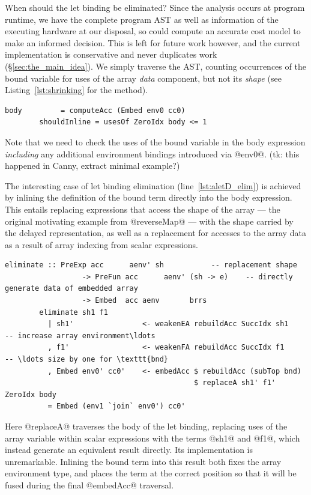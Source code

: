 When should the let binding be eliminated? Since the analysis occurs at program
runtime, we have the complete program AST as well as
information of the executing hardware at our disposal, so could compute an
accurate cost model to make an informed decision. This is left for future work
however, and the current implementation is conservative and never duplicates
work (\S\ref{sec:the_main_idea}). We simply traverse the AST, counting
occurrences of the bound variable for uses of the array \emph{data} component,
but not its \emph{shape} (see Listing~\ref{lst:shrinking} for the method).
%
\begin{lstlisting}[style=haskell,name=aletD]
        body         = computeAcc (Embed env0 cc0)
        shouldInline = usesOf ZeroIdx body <= 1
\end{lstlisting}
%
Note that we need to check the uses of the bound variable in the body expression
\emph{including} any additional environment bindings introduced via @env0@.
(tk: this happened in Canny, extract minimal example?)

The interesting case of let binding elimination (line~\ref{lst:aletD_elim}) is
achieved by inlining the definition of the bound term directly into the body
expression. This entails replacing expressions that access the shape of the
array --- the original motivating example from @reverseMap@ --- with the
shape carried by the delayed representation, as well as a replacement for
accesses to the array data as a result of array indexing from scalar
expressions.
%
\begin{lstlisting}[style=haskell,name=aletD]
        eliminate :: PreExp acc      aenv' sh           -- replacement shape
                  -> PreFun acc      aenv' (sh -> e)    -- directly generate data of embedded array
                  -> Embed  acc aenv       brrs
        eliminate sh1 f1
          | sh1'                <- weakenEA rebuildAcc SuccIdx sh1      -- increase array environment\ldots
          , f1'                 <- weakenFA rebuildAcc SuccIdx f1       -- \ldots size by one for \texttt{bnd}
          , Embed env0' cc0'    <- embedAcc $ rebuildAcc (subTop bnd)
                                            $ replaceA sh1' f1' ZeroIdx body
          = Embed (env1 `join` env0') cc0'
\end{lstlisting}
%
Here @replaceA@ traverses the body of the let binding, replacing uses of
the array variable within scalar expressions with the terms @sh1@ and
@f1@, which instead generate an equivalent result directly. Its
implementation is unremarkable. Inlining the bound term into this result both
fixes the array environment type, and places the term at the correct position so
that it will be fused during the final @embedAcc@ traversal.

